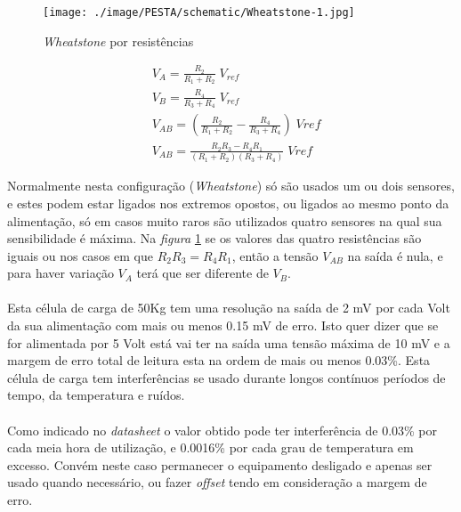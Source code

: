 \begin{minipage}[!b]{.45\linewidth}
	\begin{figure}[H]
		\captionsetup{justification=raggedright,singlelinecheck=false}
		\flushleft
		\texttt{[image: ./image/PESTA/schematic/Wheatstone-1.jpg]}
		\caption{\textit{Wheatstone} por resistências \cite{book-10}}
		\label{wheatstone-2}
	\end{figure}
\end{minipage}
\begin{minipage}[!b]{.5\linewidth}
	\setlength{\jot}{10pt}%
	\small
	\begin{align}
		\label{eq:wheatstone}
		&V_A =  \frac{R_2}{R_1 + R_2} \; V_{ref} \\ &V_B=\frac{R_4}{R_3 + R_4} \; V_{ref} \\
		&V_{AB}= \left(\frac{R_2}{R_1 + R_2} - \frac{R_4}{R_3 + R_4}\right) \; Vref \\
		&V_{AB} = \frac{R_2 R_3 - R_4 R_1}{(R_1 + R_2)(R_3 + R_4)} \; Vref
	\end{align}
\vspace{1pt}
\end{minipage}
Normalmente nesta configuração (\textit{Wheatstone}) só são usados um ou dois sensores, e estes podem estar ligados nos extremos opostos, ou ligados ao mesmo ponto da alimentação, só em casos muito raros são utilizados quatro sensores na qual sua sensibilidade é máxima. Na \textit{figura} \ref{wheatstone-2} se os valores das quatro resistências são iguais ou nos casos em que $R_2 R_3 = R_4 R_1$, então a tensão $V_{AB}$ na saída é nula, e para haver variação $V_A$ terá que ser diferente de $V_B$.
\\
\\
Esta célula de carga de 50Kg tem uma resolução na saída de 2 mV por cada Volt da sua alimentação com mais ou menos 0.15 mV de erro. Isto quer dizer que se for alimentada por 5 Volt está vai ter na saída uma tensão máxima de 10 mV e a margem de erro total de leitura esta na ordem de mais ou menos 0.03\%.
Esta célula de carga tem interferências se usado durante longos contínuos períodos de tempo, da temperatura e ruídos.
\\
\\
Como indicado no \textit{datasheet} o valor obtido pode ter interferência de 0.03\% por cada meia hora de utilização, e 0.0016\% por cada grau de temperatura em excesso. Convém neste caso permanecer o equipamento desligado e apenas ser usado quando necessário, ou fazer \textit{offset} tendo em consideração a margem de erro.
